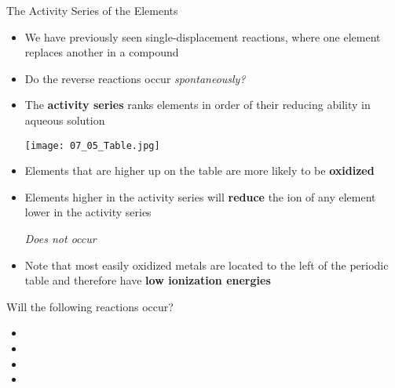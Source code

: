 \documentclass[handout]{beamer}
\begin{document}
\begin{frame}[allowframebreaks]{The Activity Series of the Elements}
	\begin{itemize}
		\item We have previously seen single-displacement reactions,
			where one element replaces another in a compound

			\begin{center}

				\medskip

			\end{center}

		\item Do the reverse reactions occur \emph{spontaneously?}

			\begin{center}

				\medskip

			\end{center}
			\framebreak
		\item The \textbf{activity series} ranks elements in order of
			their reducing ability in aqueous solution

			\begin{center}
				\texttt{[image: 07\_05\_Table.jpg]}
			\end{center}
		\item Elements that are higher up on the table are more likely
			to be \textbf{oxidized}
		\item Elements higher in the activity series will
			\textbf{reduce} the ion of any element lower in the
			activity series

			\begin{center}

				\medskip

				
				\emph{\tiny\color{red} Does
				not occur}
			\end{center}
		\item Note that most easily oxidized metals are located to the
			left of the periodic table and therefore have
			\textbf{low ionization energies}
	\end{itemize}

	\framebreak

	Will the following reactions occur?

	\begin{itemize}
		\item {}
		\item {}
		\item {}
		\item {}
	\end{itemize}
\end{frame}
\end{document}
